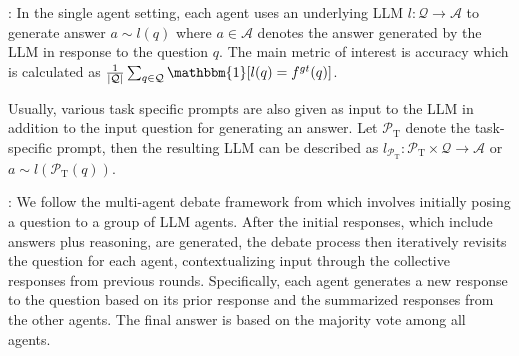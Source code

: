 \documentclass{article}
\begin{document}
:
In the single agent setting, each agent uses an underlying LLM $l : \mathcal{Q} \rightarrow \mathcal{A}$ to generate answer $a \sim l(q)$ where $a \in \mathcal{A}$ denotes the answer generated by the LLM in response to the question $q$. The main metric of interest is accuracy which is calculated as $\frac{1}{|\mathcal{Q}|} \sum_{q \in \mathcal{Q}} \mathbbm{1}[l(q) = f^{gt}(q)]$.

Usually, various task specific prompts are also given as input to the LLM in addition to the input question for generating an answer. Let $\mathcal{P}_{\text{T}}$ denote the task-specific prompt, then the resulting LLM can be described as $l_{\mathcal{P}_{\text{T}}} : \mathcal{P}_{\text{T}} \times \mathcal{Q} \rightarrow \mathcal{A}$ or $a \sim l(\mathcal{P}_{\text{T}}(q))$.


:
We follow the multi-agent debate framework from \cite{du2023improvingfactualityreasoninglanguage,subramaniam2025multiagent} which involves initially posing a question to a group of LLM agents. After the initial responses, which include answers plus reasoning, are generated, the debate process then iteratively revisits the question for each agent, contextualizing input through the collective responses from previous rounds. Specifically, each agent generates a new response to the question based on its prior response and the summarized responses from the other agents. The final answer is based on the majority vote among all agents.
\end{document}

